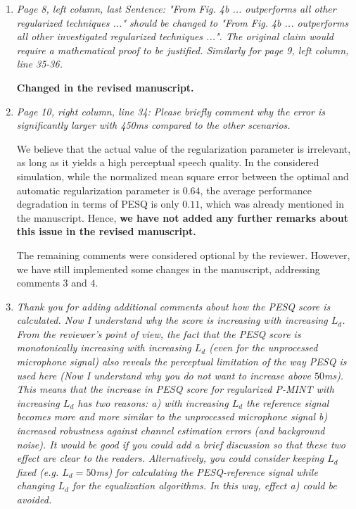 \documentclass[11pt, a4paper]{article}
\begin{document}
\begin{enumerate}

  \item {\textit{
Page 8, left column, last Sentence: "From Fig. 4b ... outperforms all other regularized
techniques ..." should be changed to "From Fig. 4b ... outperforms all other investigated regularized
techniques ...". The original claim would require a mathematical proof to be justified.
Similarly for page 9, left column, line 35-36.
}}

{\bf Changed in the revised manuscript.}


\item {\textit{
Page 10, right column, line 34: Please briefly comment why the error is significantly larger with
450ms compared to the other scenarios.
}}

We believe that the actual value of the regularization parameter is irrelevant, as long as it yields a high perceptual speech quality. 
In the considered simulation, while the normalized mean square error between the optimal and automatic regularization parameter is $0.64$, the average performance degradation in terms of PESQ is only $0.11$, which was already mentioned in the manuscript.
Hence, {\bf{we have not added any further remarks about this issue in the revised manuscript}.}

\vspace{0.3cm}

The remaining comments were considered optional by the reviewer.
However, we have still implemented some changes in the manuscript, addressing comments $3$ and $4$.

\vspace{0.3cm}


\item {\textit{
Thank you for adding additional comments about how the PESQ score is calculated. Now I understand why the score is increasing with increasing $L_d$.
From the reviewer's point of view, the fact that the PESQ score is monotonically increasing with increasing $L_d$ (even for the unprocessed microphone signal) also reveals the perceptual limitation of the way PESQ is used here (Now I understand why you do not want to increase above $50$ms). This means that the increase in PESQ score for regularized P-MINT with increasing $L_d$ has two reasons: \newline
a) with increasing $L_d$ the reference signal becomes more and more similar to the unprocessed microphone signal \newline
b) increased robustness against channel estimation errors (and background noise). \newline
It would  be good if you could add a brief discussion so that these two effect are clear to the readers. Alternatively, you could consider keeping $L_d$ fixed (e.g. $L_d=50$ms) for calculating the PESQ-reference signal while changing $L_d$ for the equalization algorithms. In this way, effect a) could be
avoided.
}}


\end{enumerate}
\end{document}

